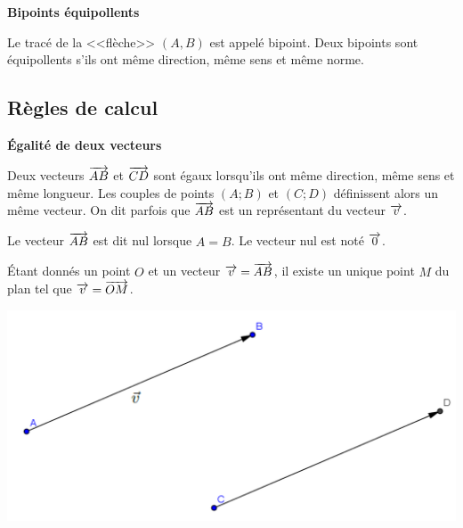\documentclass[10pt,oneside]{article}
\begin{document}
\begin{rem}
\textbf{Bipoints équipollents}

Le tracé de la <<flèche>> $(A,B)$ est appelé bipoint. Deux bipoints sont équipollents s'ils ont même direction, même sens et même norme. 
\end{rem}

\subsection{Règles de calcul}
\begin{minipage}[c]{.7\linewidth}
\begin{propo}
\textbf{Égalité de deux vecteurs}

Deux vecteurs $\overrightarrow{AB}$ et $\overrightarrow{CD}$  sont égaux lorsqu'ils ont même direction, même sens et même longueur. Les
couples de points $(A;B)$ et $(C;D)$ définissent alors un même vecteur. On dit parfois que $\overrightarrow{AB}$ est un représentant du vecteur $\overrightarrow{v}$.

Le vecteur $\overrightarrow{AB}$ est dit nul lorsque $A = B$. Le vecteur
nul est noté $\overrightarrow{0}$.

Étant donnés un point $O$ et un vecteur $\overrightarrow{v} = \overrightarrow{AB}$, il existe un unique point $M$ du plan tel que $\overrightarrow{v} = \overrightarrow{OM}$.

\end{propo}

\end{minipage}\hfill
\begin{minipage}[c]{.28\linewidth}
\begin{center}
\includegraphics[width=.95\textwidth]{png/vecteur}
\end{center}
\end{minipage}
\end{document}
